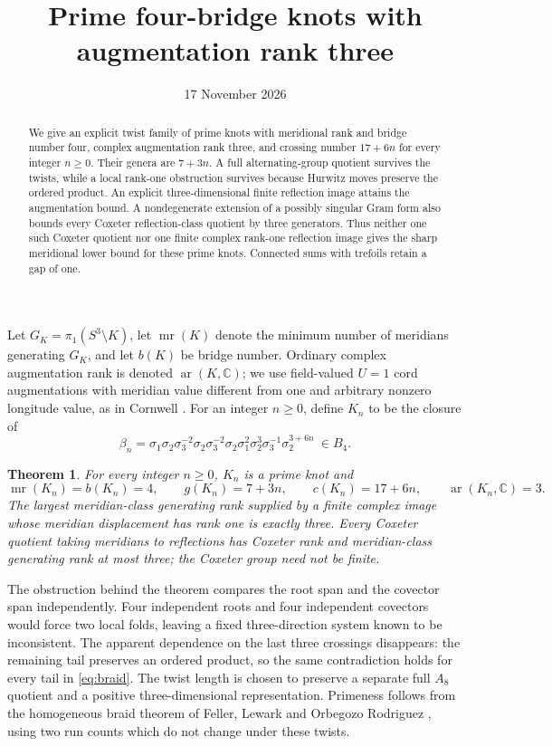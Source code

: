 \documentclass[11pt]{article}
\title{Prime four-bridge knots with augmentation rank three}
\author{}
\date{17 November 2026}
\newtheorem{theorem}{Theorem}
\newcommand{\mr}{\operatorname{mr}}
\newcommand{\ar}{\operatorname{ar}}
\newcommand{\C}{\mathbb C}
\begin{document}
\maketitle
\begin{abstract}
We give an explicit twist family of prime knots with meridional rank and
bridge number four, complex augmentation rank three, and crossing number
$17+6n$ for every integer $n\ge0$. Their genera are $7+3n$.
A full alternating-group quotient survives the twists, while a local
rank-one obstruction survives because Hurwitz moves preserve the ordered
product. An explicit three-dimensional finite reflection image attains
the augmentation bound. A nondegenerate extension of a possibly singular
Gram form also bounds every Coxeter reflection-class quotient by three
generators. Thus neither one such Coxeter quotient nor one finite complex
rank-one reflection image gives the sharp meridional lower bound for
these prime knots. Connected sums with trefoils retain a gap of one.
\end{abstract}

Let $G_K=\pi_1(S^3\setminus K)$, let $\mr(K)$ denote the minimum number
of meridians generating $G_K$, and let $b(K)$ be bridge number. Ordinary
complex augmentation rank is denoted $\ar(K,\C)$; we use field-valued
$U=1$ cord augmentations with meridian value different from one and
arbitrary nonzero longitude value, as in Cornwell
\cite[Definition~1.8]{cornwell}.
For an integer $n\ge0$, define $K_n$ to be the closure of
\begin{equation}\label{eq:braid}
 \beta_n=\sigma_1\sigma_2\sigma_3^{-2}\sigma_2
 \sigma_3^{-2}\sigma_2\sigma_1^2\sigma_2^3
 \sigma_3^{-1}\sigma_2^{3+6n}\ \in B_4.
\end{equation}

\begin{theorem}\label{thm:main}
For every integer $n\ge0$, $K_n$ is a prime knot and
\[
 \mr(K_n)=b(K_n)=4,\qquad g(K_n)=7+3n,\qquad c(K_n)=17+6n,
 \qquad \ar(K_n,\C)=3.
\]
The largest meridian-class generating rank supplied by a finite complex
image whose meridian displacement has rank one is exactly three.
Every Coxeter quotient taking meridians to reflections has Coxeter rank
and meridian-class generating rank at most three; the Coxeter group need
not be finite.
\end{theorem}

The obstruction behind the theorem compares the root span and the
covector span independently. Four independent roots and four independent
covectors would force two local folds, leaving a fixed three-direction
system known to be inconsistent. The apparent dependence on the last
three crossings disappears: the remaining tail preserves an ordered
product, so the same contradiction holds for every tail in
\eqref{eq:braid}. The twist length is chosen to preserve a separate full
$A_8$ quotient and a positive three-dimensional representation.
Primeness follows from the homogeneous braid theorem of Feller,
Lewark and Orbegozo Rodriguez \cite{flo}, using two run counts which
do not change under these twists.
\end{document}
